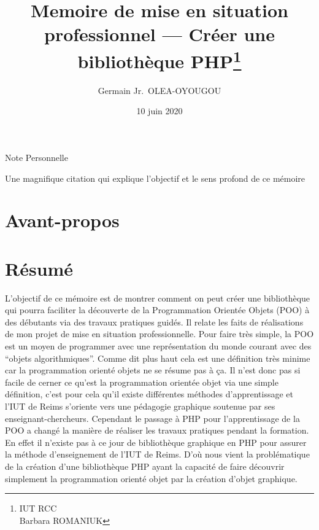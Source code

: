 \documentclass[11pt,a4paper,krantz2,11pt,oneside]{krantz}
\title{Memoire de mise en situation professionnel --- Créer une bibliothèque PHP\thanks{IUT RCC\\
Barbara ROMANIUK}}
\author{Germain Jr.~OLEA-OYOUGOU}
\date{10 juin 2020}
\begin{document}
\maketitle

\thispagestyle{empty}
\begin{center}
\Large{Note Personnelle}

\large{Une magnifique citation qui explique l'objectif et le sens profond de ce mémoire}
\end{center}

\setlength{\abovedisplayskip}{-5pt}
\setlength{\abovedisplayshortskip}{-5pt}

{
\hypersetup{linkcolor=}
\setcounter{tocdepth}{1}
\tableofcontents
}
\listoftables
\listoffigures
\hypertarget{avant-propos}{%
\chapter*{Avant-propos}\label{avant-propos}}


\mainmatter

\hypertarget{ruxe9sumuxe9}{%
\chapter*{Résumé}\label{ruxe9sumuxe9}}


L'objectif de ce mémoire est de montrer comment on peut créer une bibliothèque qui pourra faciliter la découverte de la Programmation Orientée Objets (POO) à des débutants via des travaux pratiques guidés. Il relate les faits de réalisations de mon projet de mise en situation professionnelle. Pour faire très simple, la POO est un moyen de programmer avec une représentation du monde courant avec des ``objets algorithmiques''. Comme dit plus haut cela est une définition très minime car la programmation orienté objets ne se résume pas à ça. Il n'est donc pas si facile de cerner ce qu'est la programmation orientée objet via une simple définition, c'est pour cela qu'il existe différentes méthodes d'apprentissage et l'IUT de Reims s'oriente vers une pédagogie graphique soutenue par ses enseignant-chercheurs. Cependant le passage à PHP pour l'apprentissage de la POO a changé la manière de réaliser les travaux pratiques pendant la formation. En effet il n'existe pas à ce jour de bibliothèque graphique en PHP pour assurer la méthode d'enseignement de l'IUT de Reims. D'où nous vient la problématique de la création d'une bibliothèque PHP ayant la capacité de faire découvrir simplement la programmation orienté objet par la création d'objet graphique.
\end{document}

